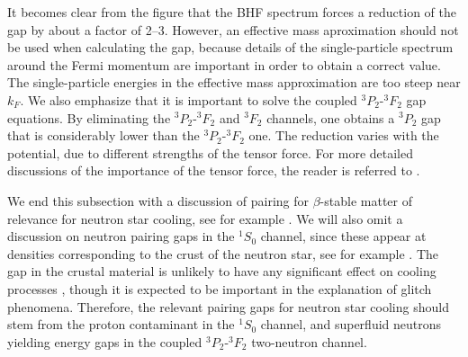 \documentclass[rmp,aps,floatfix]{revtex4}
\begin{document}
It becomes clear from the figure that the BHF spectrum forces a 
reduction of the gap by about a factor of 2--3.
However, an effective mass aproximation should not be used when 
calculating the gap,  
because details of the single-particle spectrum around the Fermi 
momentum are important in order to obtain a correct value.   
The single-particle energies in the effective mass 
approximation are too steep near $k_F$.
We also emphasize that it is important to solve the coupled 
$^3P_2$-$^3F_2$ gap equations.  
By eliminating the $^3P_2$-$^3F_2$ and $^3F_2$ channels, 
one obtains a $^3P_2$ gap that is considerably lower than the 
$^3P_2$-$^3F_2$ one.  
The reduction varies with the potential,
due to different strengths of the tensor force.
For more detailed discussions of the importance of the tensor force, 
the reader is referred to \cite{amu85,taka93,elga96,kkc2001,kkc1998}.


We end this subsection
with a discussion of pairing for $\beta$-stable
matter of relevance for neutron star cooling, see for example 
 \cite{nstar,pethick1992}.
We will also omit a discussion on neutron pairing gaps in the
$^1S_0$ channel, since these appear at densities corresponding 
to the crust of the neutron star, see for example
\cite{barranco1997}. The gap in the crustal material 
is unlikely
to have any significant effect on cooling processes \cite{pr95}, 
though
it is expected to be important in the explanation 
of glitch phenomena.
Therefore, the relevant pairing gaps for neutron star cooling
should stem from 
the proton contaminant 
in the $^1S_0$ channel, and superfluid neutrons yielding energy gaps 
in the coupled $^3P_2$-$^3F_2$ two-neutron channel. 
\end{document}
